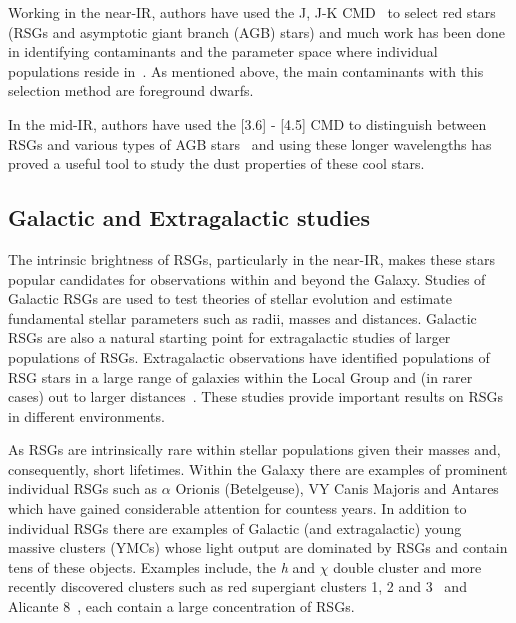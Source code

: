 {Working in the near-IR, authors have used the J, J-K CMD~\citep[e.g.][]{2000ApJ...542..804N,2006A&A...452..195C,Neugent12} to select red stars (RSGs and asymptotic giant branch (AGB) stars) and much work has been done in identifying contaminants and the parameter space where individual populations reside in~\citep{2006A&A...452..195C}.
As mentioned above, the main contaminants with this selection method are foreground dwarfs.

In the mid-IR, authors have used the [3.6] - [4.5] CMD to distinguish between RSGs and various types of AGB stars~\citep{2006AJ....132.2034B,2014A&A...562A..75B,2015A&A...584A..33B,2015ApJ...800...51B,2015A&A...578A.100W} and using these longer wavelengths has proved a useful tool to study the dust properties of these cool stars.



\subsection{Galactic and Extragalactic studies} %
\label{sub:galactic_and_extragalactic}

The intrinsic brightness of RSGs, particularly in the near-IR, makes these stars popular candidates for observations within and beyond the Galaxy.
Studies of Galactic RSGs are used to test theories of stellar evolution and estimate fundamental stellar parameters such as radii, masses and distances.
Galactic RSGs are also a natural starting point for extragalactic studies of larger populations of RSGs.
Extragalactic observations have identified populations of RSG stars in a large range of galaxies within the Local Group and (in rarer cases) out to larger distances~\citep[e.g.][]{Elias85,Humphreys86, Massey06, 2007AJ....134.2474M, Groenewegen09,Massey13}. %
These studies provide important results on RSGs in different environments.


As RSGs are intrinsically rare within stellar populations given their masses and, consequently, short lifetimes.
Within the Galaxy there are examples of prominent individual RSGs such as $\alpha$ Orionis (Betelgeuse), VY Canis Majoris and Antares which have gained considerable attention for countess years\footnotemark.
In addition to individual RSGs there are examples of Galactic (and extragalactic) young massive clusters (YMCs) whose light output are dominated by RSGs and contain tens of these objects.
Examples include, the {\it h} and $\chi$ double cluster and more recently discovered clusters such as  red supergiant clusters 1, 2 and 3~\citep[RSGC01, RSGC02, RSGC03][respectively]{2006ApJ...643.1166F,2007ApJ...671..781D,2009A&A...498..109C} and Alicante 8~\citep{2010A&A...513A..74N}, each contain a large concentration of RSGs.

}
